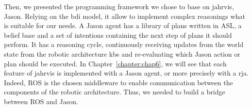 \documentclass[a4paper,11pt,twoside]{StyleThese}
\begin{document}
Then, we presented the programming framework we chose to base on \acrshort{jahrvis}, Jason. Relying on the \acrshort{bdi} model, it allow to implement complex reasonings what is suitable for our needs. A Jason agent has a library of plans written in ASL, a belief base and a set of intentions containing the next step of plans it should perform. It has a reasoning cycle, continuously receiving updates from the world state from the robotic architecture \acrshort{kb}s and re-evaluating which Jason action or plan should be executed. In Chapter~\ref{chapter:chap6}, we will see that each feature of \acrshort{jahrvis} is implemented with a Jason agent, or more precisely with a \acrfull{rja}. Indeed, ROS is the chosen middleware to enable communication between the components of the robotic architecture. Thus, we needed to build a bridge between ROS and Jason. 


\ifdefined{}
\else


\end{document}
